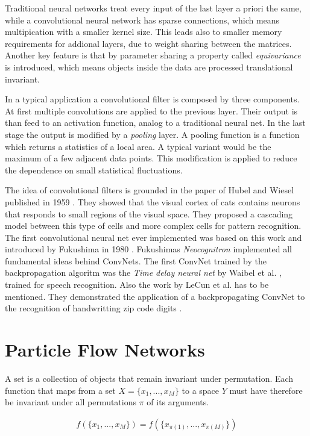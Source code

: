 \documentclass[12pt, a4paper]{thesis}
\begin{document}
Traditional neural networks treat every input of the last layer a
priori the same, while a convolutional neural network has sparse
connections, which means multipication with a smaller kernel
size. This leads also to smaller memory requirements for addional
layers, due to weight sharing between the matrices.  Another key
feature is that by parameter sharing a property called
\emph{equivariance} is introduced, which means objects inside the data
are processed translational invariant.

In a typical application a convolutional filter is composed by three
components.  At first multiple convolutions are applied to the
previous layer. Their output is than feed to an activation function,
analog to a traditional neural net.  In the last stage the output is
modified by a \emph{pooling} layer. A pooling function is a function
which returns a statistics of a local area. A typical variant would be
the maximum of a few adjacent data points. This modification is
applied to reduce the dependence on small statistical fluctuations.

The idea of convolutional filters is grounded in the paper of Hubel
and Wiesel published in 1959 \cite{hubel59}. They showed that the
visual cortex of cats contains neurons that responds to small regions
of the visual space. They proposed a cascading model between this type
of cells and more complex cells for pattern recognition. The first
convolutional neural net ever implemented was based on this work and
introduced by Fukushima in 1980 \cite{neocognitron}. Fukushimas
\emph{Neocognitron} implemented all fundamental ideas behind ConvNets.
The first ConvNet trained by the backpropagation algoritm was the
\emph{Time delay neural net} by Waibel et
al. \cite{hampshire89,waibel90}, trained for speech recognition. Also
the work by LeCun et al. has to be mentioned. They demonstrated the
application of a backpropagating ConvNet to the recognition of
handwritting zip code digits \cite{lecun89}.

\section{Particle Flow Networks}
\label{sec:orgde973b7}

A set is a collection of objects that remain invariant under permutation. Each function that maps from a set \(X = \{x_1, ... , x_M \}\) to a space \(Y\) must have
therefore be invariant under all permutations $\pi$ of its arguments.

\begin{align}
f(\{x_1, ... , x_M \}) = f(\{x_{\pi(1)}, ... , x_{\pi(M)}\})
\end{align}
\end{document}
